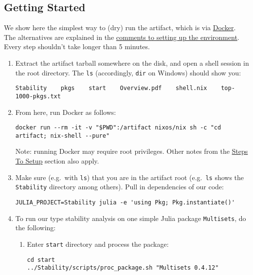 \documentclass[
]{article}
\author{}
\date{}
\begin{document}
\hypertarget{getting-started}{%
\subsection{Getting Started}\label{getting-started}}

We show here the simplest way to (dry) run the artifact, which is via
\href{https://docs.docker.com/get-docker/}{Docker}. The alternatives are
explained in the
\protect\hyperlink{comments-on-setting-up-environment}{comments to
setting up the environment}. Every step shouldn't take longer than 5
minutes.

\begin{enumerate}
\def\labelenumi{\arabic{enumi}.}
\item
  Extract the artifact tarball somewhere on the disk, and open a shell
  session in the root directory. The \texttt{ls} (accordingly,
  \texttt{dir} on Windows) should show you:

\begin{verbatim}
Stability    pkgs    start    Overview.pdf    shell.nix    top-1000-pkgs.txt
\end{verbatim}
\item
  From here, run Docker as follows:

{\small
\begin{verbatim}
docker run --rm -it -v "$PWD":/artifact nixos/nix sh -c "cd artifact; nix-shell --pure"
\end{verbatim}
}

  Note: running Docker may require root privileges. Other notes from the
  \protect\hyperlink{steps-to-setup}{Steps To Setup} section also apply.
\item
  Make sure (e.g.~with \texttt{ls}) that you are in the artifact root
  (e.g.~\texttt{ls} shows the \texttt{Stability} directory among
  others). Pull in dependencies of our code:

\begin{verbatim}
JULIA_PROJECT=Stability julia -e 'using Pkg; Pkg.instantiate()'
\end{verbatim}
\item
  To run our type stability analysis on one simple Julia package
  \texttt{Multisets}, do the following:

  \begin{enumerate}
  \def\labelenumii{\alph{enumii}.}
  \item
    Enter \texttt{start} directory and process the package:

\begin{verbatim}
cd start
../Stability/scripts/proc_package.sh "Multisets 0.4.12"
\end{verbatim}


\end{enumerate}
\end{enumerate}
\end{document}
